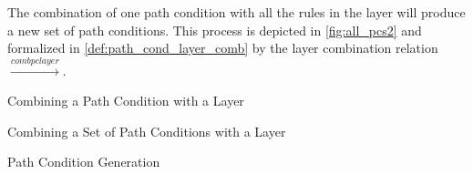 The combination of one path condition with all the rules in the layer will produce a new set of path conditions. This process is depicted in \cref{fig:all_pcs2} and formalized in \cref{def:path_cond_layer_comb} by the layer combination relation $\stackrel{combpclayer}{\rightarrow}$.

\begin{definition} {Combining a Path Condition with a Layer\\}
\label{def:path_cond_layer_comb}
\end{definition}


\begin{definition} {Combining a Set of Path Conditions with a Layer\\}
\label{def:path_cond_set_layer_comb}
\end{definition}


\begin{definition} {Path Condition Generation\\}
\label{def:path_cond_gen}
\end{definition}






